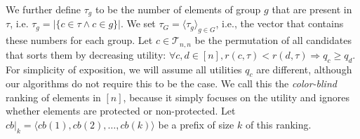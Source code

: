 We further define $\tau_g$ to be the number of elements of group $ g $ that are present in $\tau$, i.e. $\tau_g = | \{ c \in \tau \wedge c \in g \} |$.
%
We set $ \tau_G = \langle\tau_g\rangle_{g \in G}$, i.e., the vector that contains these numbers for each group.
%
Let $c \in {\mathcal T}_{n,n}$ be the permutation of all candidates that sorts them by decreasing utility: $\forall c,d \in [n], r(c,\tau) < r(d,\tau) \Rightarrow q_c \ge q_d$.
%
For simplicity of exposition, we will assume all utilities $q_c$ are different, although our algorithms do not require this to be the case.
%
We call this the \emph{color-blind} ranking of elements in $[n]$, because it simply focuses on the utility and ignores whether elements are protected or non-protected.
%
Let $\textit{cb}|_k = \langle \textit{cb}(1), \textit{cb}(2), \ldots, \textit{cb}(k) \rangle$ be a prefix of size $k$ of this ranking. \label{concept:color-blind-ranking}
%

